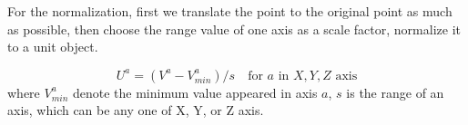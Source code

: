 For the normalization, first we translate the point to the original point as much as possible, then choose the range value of one axis as a scale factor, normalize it to a unit object. 

\begin{equation}\label{eq:normalization}
	U^a = (V^a - V^a_{min}) / s  \quad  \text{for } a \text{ in }  X,Y,Z \text{ axis}
\end{equation}
where $ V^a_{min} $ denote the minimum value appeared in axis $ a $, $ s $ is the range of an axis, which can be any one of X, Y, or Z axis.
